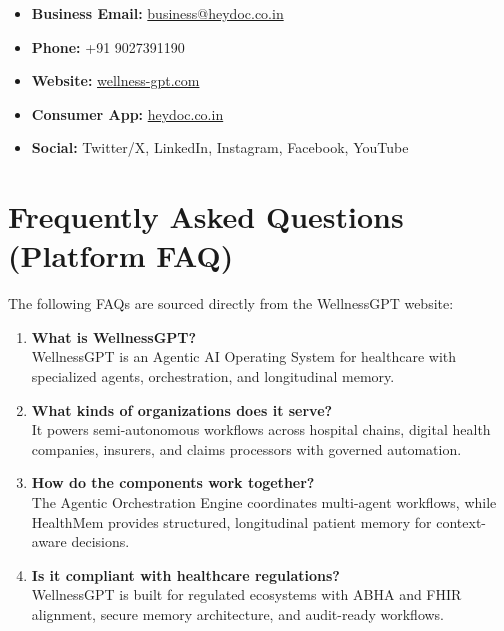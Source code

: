 \documentclass[12pt,a4paper]{article}
\begin{document}
\begin{itemize}[noitemsep]
    \item \textbf{Business Email:} \href{mailto:business@heydoc.co.in}{business@heydoc.co.in}
    \item \textbf{Phone:} +91 9027391190
    \item \textbf{Website:} \href{https://wellness-gpt.com}{wellness-gpt.com}
    \item \textbf{Consumer App:} \href{https://heydoc.co.in}{heydoc.co.in}
    \item \textbf{Social:} Twitter/X, LinkedIn, Instagram, Facebook, YouTube
\end{itemize}

\newpage

\section{Frequently Asked Questions (Platform FAQ)}

The following FAQs are sourced directly from the WellnessGPT website:

\begin{enumerate}
    \item \textbf{What is WellnessGPT?}\\
    WellnessGPT is an Agentic AI Operating System for healthcare with specialized agents, orchestration, and longitudinal memory.

    \item \textbf{What kinds of organizations does it serve?}\\
    It powers semi-autonomous workflows across hospital chains, digital health companies, insurers, and claims processors with governed automation.

    \item \textbf{How do the components work together?}\\
    The Agentic Orchestration Engine coordinates multi-agent workflows, while HealthMem provides structured, longitudinal patient memory for context-aware decisions.

    \item \textbf{Is it compliant with healthcare regulations?}\\
    WellnessGPT is built for regulated ecosystems with ABHA and FHIR alignment, secure memory architecture, and audit-ready workflows.
\end{enumerate}
\end{document}
